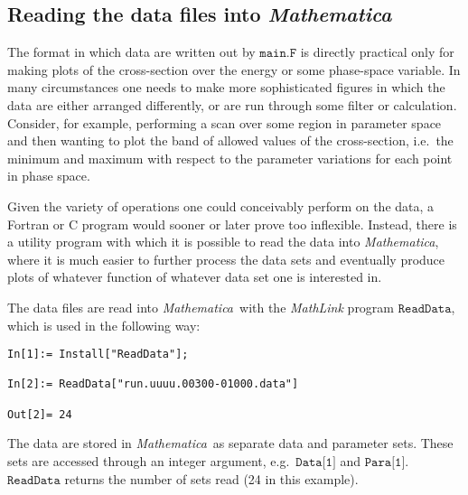 \documentclass[twoside,11pt]{article}
\makeatletter
\def\indextt#1{\index{#1@\texttt{#1}}}
\def\mma{\textit{Mathematica}}
\def\Code#1{\ensuremath{\texttt{#1}}}
\def\ie{i.e.\ }
\def\eg{e.g.\ }
\makeatother
\begin{document}
\subsection{Reading the data files into \mma}

The format in which data are written out by \Code{main.F} is directly
practical only for making plots of the cross-section over the energy or
some phase-space variable.  In many circumstances one needs to make more
sophisticated figures in which the data are either arranged differently,
or are run through some filter or calculation.  Consider, for example,
performing a scan over some region in parameter space and then wanting to
plot the band of allowed values of the cross-section, \ie the minimum and
maximum with respect to the parameter variations for each point in phase
space.

Given the variety of operations one could conceivably perform on the data,
a Fortran or C program would sooner or later prove too inflexible.
Instead, there is a utility program with which it is possible to read the
data into \mma, where it is much easier to further process the data sets
and eventually produce plots of whatever function of whatever data set one
is interested in.

The data files are read into \mma\ with the \textit{MathLink} program
\Code{ReadData}, which is used in the following way:
\begin{verbatim}
In[1]:= Install["ReadData"];

In[2]:= ReadData["run.uuuu.00300-01000.data"]

Out[2]= 24
\end{verbatim}
\indextt{ReadData}%
The data are stored in \mma\ as separate data and parameter sets.  These
sets are accessed through an integer argument, \eg \Code{Data[1]} and
\Code{Para[1]}.  \Code{ReadData} returns the number of sets read (24 in
this example).
\end{document}
